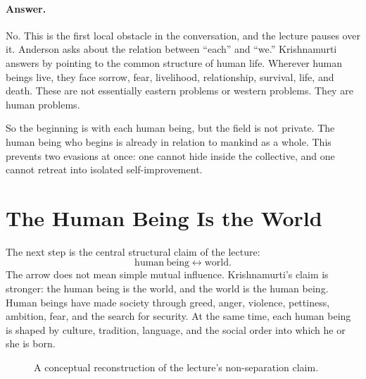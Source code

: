 \paragraph{Answer.}
No. This is the first local obstacle in the conversation, and the lecture pauses over it. Anderson asks about the relation between ``each'' and ``we.'' Krishnamurti answers by pointing to the common structure of human life. Wherever human beings live, they face sorrow, fear, livelihood, relationship, survival, life, and death. These are not essentially eastern problems or western problems. They are human problems.

So the beginning is with each human being, but the field is not private. The human being who begins is already in relation to mankind as a whole. This prevents two evasions at once: one cannot hide inside the collective, and one cannot retreat into isolated self-improvement.

\section{The Human Being Is the World}

The next step is the central structural claim of the lecture:
\begin{equation}
\mathrm{human\ being}
\leftrightarrow
\mathrm{world}.
\end{equation}
The arrow does not mean simple mutual influence. Krishnamurti's claim is stronger: the human being is the world, and the world is the human being. Human beings have made society through greed, anger, violence, pettiness, ambition, fear, and the search for security. At the same time, each human being is shaped by culture, tradition, language, and the social order into which he or she is born.

\begin{figure}
\centering
{}
\caption{A conceptual reconstruction of the lecture's non-separation claim.}
\end{figure}

